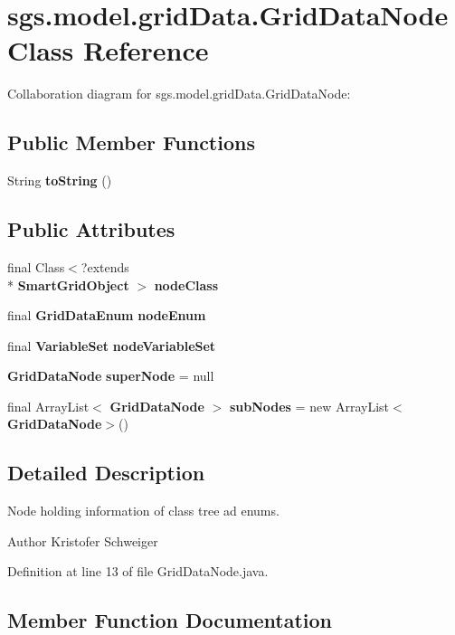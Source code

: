 \section{sgs.\-model.\-grid\-Data.\-Grid\-Data\-Node Class Reference}
\label{classsgs_1_1model_1_1grid_data_1_1_grid_data_node}


Collaboration diagram for sgs.\-model.\-grid\-Data.\-Grid\-Data\-Node\-:
\subsection*{Public Member Functions}
\begin{DoxyCompactItemize}
\item 
String {\bf to\-String} ()
\end{DoxyCompactItemize}
\subsection*{Public Attributes}
\begin{DoxyCompactItemize}
\item 
final Class$<$?extends \\*
{\bf Smart\-Grid\-Object} $>$ {\bf node\-Class}
\item 
final {\bf Grid\-Data\-Enum} {\bf node\-Enum}
\item 
final {\bf Variable\-Set} {\bf node\-Variable\-Set}
\item 
{\bf Grid\-Data\-Node} {\bf super\-Node} = null
\item 
final Array\-List$<$ {\bf Grid\-Data\-Node} $>$ {\bf sub\-Nodes} = new Array\-List$<${\bf Grid\-Data\-Node}$>$()
\end{DoxyCompactItemize}


\subsection{Detailed Description}
Node holding information of class tree ad enums.

\begin{DoxyAuthor}{Author}
Kristofer Schweiger 
\end{DoxyAuthor}


Definition at line 13 of file Grid\-Data\-Node.\-java.



\subsection{Member Function Documentation}
